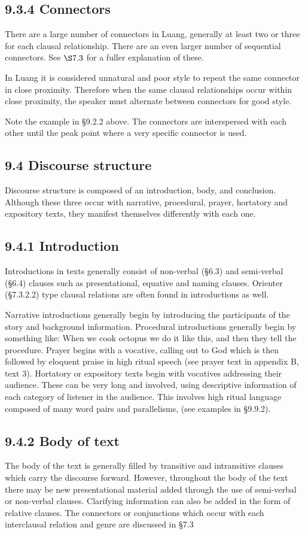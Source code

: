 \documentclass[10pt]{article}
\begin{document}
\subsection*{9.3.4 Connectors}
There are a large number of connectors in Luang, generally at least two or three for each clausal relationship. There are an even larger number of sequential connectors. See \(\S 7.3\) for a fuller explanation of these.

In Luang it is considered unnatural and poor style to repeat the same connector in close proximity. Therefore when the same clausal relationships occur within close proximity, the speaker must alternate between connectors for good style.

Note the example in §9.2.2 above. The connectors are interspersed with each other until the peak point where a very specific connector is used.

\subsection*{9.4 Discourse structure}
Discourse structure is composed of an introduction, body, and conclusion. Although these three occur with narrative, procedural, prayer, hortatory and expository texts, they manifest themselves differently with each one.

\subsection*{9.4.1 Introduction}
Introductions in texts generally consist of non-verbal (§6.3) and semi-verbal (§6.4) clauses such as presentational, equative and naming clauses. Orienter (§7.3.2.2) type clausal relations are often found in introductions as well.

Narrative introductions generally begin by introducing the participants of the story and background information. Procedural introductions generally begin by something like: When we cook octopus we do it like this, and then they tell the procedure. Prayer begins with a vocative, calling out to God which is then followed by eloquent praise in high ritual speech (see prayer text in appendix B, text 3). Hortatory or expository texts begin with vocatives addressing their audience. These can be very long and involved, using descriptive information of each category of listener in the audience. This involves high ritual language composed of many word pairs and parallelisms, (see examples in §9.9.2).

\subsection*{9.4.2 Body of text}
The body of the text is generally filled by transitive and intransitive clauses which carry the discourse forward. However, throughout the body of the text there may be new presentational material added through the use of semi-verbal or non-verbal clauses. Clarifying information can also be added in the form of relative clauses. The connectors or conjunctions which occur with each interclausal relation and genre are discussed in §7.3
\end{document}
